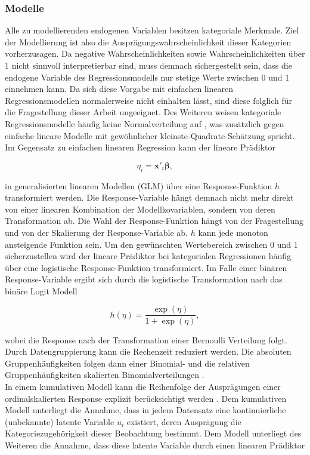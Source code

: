 \documentclass{Vorlage}
\begin{document}
\subsubsection{Modelle}
Alle zu modellierenden endogenen Variablen besitzen kategoriale Merkmale. Ziel der Modellierung ist also  die Ausprägungswahrscheinlichkeit dieser Kategorien vorherzusagen. Da negative Wahrscheinlichkeiten sowie Wahrscheinlichkeiten über 1 nicht sinnvoll interpretierbar sind, muss demnach sichergestellt sein, dass die endogene Variable des Regressionsmodells nur stetige Werte zwischen 0 und 1 einnehmen kann. Da sich diese Vorgabe mit einfachen linearen Regressionsmodellen normalerweise nicht einhalten lässt, sind diese folglich für die Fragestellung dieser Arbeit ungeeignet. Des Weiteren weisen kategoriale Regressionsmodelle häufig keine Normalverteilung auf \cite[p. 277]{fahrmeir2013regression}, was zusätzlich gegen einfache lineare Modelle mit gewöhnlicher kleinste-Quadrate-Schätzung spricht. Im Gegensatz zu einfachen linearen Regression kann der lineare Prädiktor

\begin{equation} \label{linPraed}
\eta_{i} =\mathbf{x}'_i \boldsymbol{\beta},
\end{equation}

in generalisierten linearen Modellen (GLM) über eine Response-Funktion $h$ transformiert werden. Die Response-Variable hängt demnach nicht mehr direkt von einer linearen Kombination der Modellkovariablen, sondern von deren Transformation ab. Die Wahl der Response-Funktion hängt von der Fragestellung und von der Skalierung der Response-Variable ab. $h$ kann jede monoton ansteigende Funktion sein. Um den gewünschten Wertebereich zwischen 0 und 1 sicherzustellen wird der lineare Prädiktor bei kategorialen Regressionen häufig über eine logistische Response-Funktion transformiert. Im Falle einer binären Response-Variable ergibt sich durch die logistische Transformation nach \cite[p. 270 f.]{fahrmeir2013regression} das binäre Logit Modell

\begin{equation} \label{logit}
h(\eta)=\frac{\exp(\eta)}{1+\exp(\eta)},
\end{equation}

wobei die Response nach der Transformation einer Bernoulli Verteilung folgt. Durch Datengruppierung kann die Rechenzeit reduziert werden. Die absoluten Gruppenhäufigkeiten folgen dann einer Binomial- und die relativen Gruppenhäufigkeiten skalierten Binomialverteilungen \cite[p. 277 f.]{fahrmeir2013regression}.\\
In einem kumulativen Modell kann die Reihenfolge der Ausprägungen einer ordinalskalierten Response explizit berücksichtigt werden \cite[p.334 ff.]{fahrmeir2013regression}. Dem kumulativen Modell unterliegt die Annahme, dass in jedem Datensatz eine kontinuierliche (unbekannte) latente Variable $u_i$ existiert, deren Ausprägung die Kategoriezugehörigkeit dieser Beobachtung bestimmt. Dem Modell unterliegt des Weiteren die Annahme, dass diese latente Variable durch einen linearen Prädiktor
\end{document}
